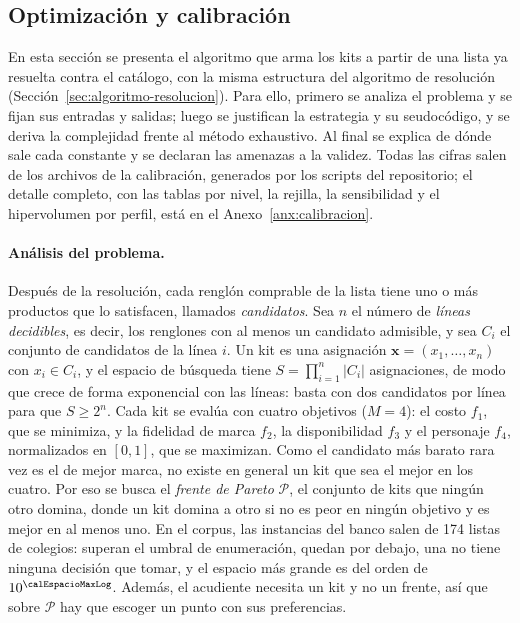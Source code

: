 \subsection{Optimización y calibración}
\label{sec:optimizacion-cal}

En esta sección se presenta el algoritmo que arma los kits a partir de una lista ya resuelta contra
el catálogo, con la misma estructura del algoritmo de resolución
(Sección~\ref{sec:algoritmo-resolucion}). Para ello, primero se analiza el problema y se fijan sus
entradas y salidas; luego se justifican la estrategia y su seudocódigo, y se deriva la complejidad
frente al método exhaustivo. Al final se explica de dónde sale cada constante y se declaran las
amenazas a la validez. Todas las cifras salen de los archivos de la calibración, generados por los
scripts del repositorio; el detalle completo, con las tablas por nivel, la rejilla, la sensibilidad
y el hipervolumen por perfil, está en el Anexo~\ref{anx:calibracion}.

\paragraph{Análisis del problema.} Después de la resolución, cada renglón comprable de la lista
tiene uno o más productos que lo satisfacen, llamados \emph{candidatos}. Sea $n$ el número de
\emph{líneas decidibles}, es decir, los renglones con al menos un candidato admisible, y sea $C_i$
el conjunto de candidatos de la línea $i$. Un kit es una asignación
$\mathbf{x}=(x_1,\dots,x_n)$ con $x_i\in C_i$, y el espacio de búsqueda tiene
$S=\prod_{i=1}^{n}|C_i|$ asignaciones, de modo que crece de forma exponencial con las líneas:
basta con dos candidatos por línea para que $S\geq 2^n$. Cada kit se evalúa con cuatro objetivos
($M=4$): el costo $f_1$, que se minimiza, y la fidelidad de marca $f_2$, la disponibilidad $f_3$ y
el personaje $f_4$, normalizados en $[0,1]$, que se maximizan. Como el candidato más barato rara
vez es el de mejor marca, no existe en general un kit que sea el mejor en los cuatro. Por eso se
busca el \emph{frente de Pareto} $\mathcal{P}$, el conjunto de kits que ningún otro domina, donde
un kit domina a otro si no es peor en ningún objetivo y es mejor en al menos uno. En el corpus, las
\calListas{} instancias del banco salen de 174 listas de \calColegios{} colegios: \calListasNsga{}
superan el umbral de enumeración, \calListasExacto{} quedan por debajo, una no tiene ninguna
decisión que tomar, y el espacio más grande es del orden de $10^{\calEspacioMaxLog}$. Además, el
acudiente necesita un kit y no un frente, así que sobre $\mathcal{P}$ hay que escoger un punto con
sus preferencias.

